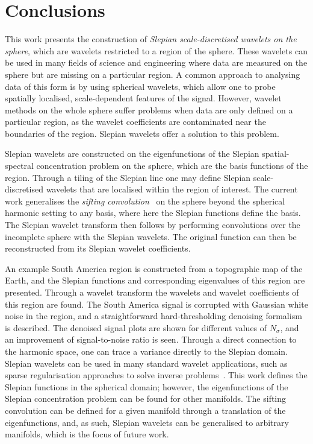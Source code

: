 

\section{Conclusions}\label{sec:chapter3_conclusion}

This work presents the construction of \emph{Slepian scale-discretised wavelets on the sphere}, which are wavelets restricted to a region of the sphere.
These wavelets can be used in many fields of science and engineering where data are measured on the sphere but are missing on a particular region.
A common approach to analysing data of this form is by using spherical wavelets, which allow one to probe spatially localised, scale-dependent features of the signal.
However, wavelet methods on the whole sphere suffer problems when data are only defined on a particular region, as the wavelet coefficients are contaminated near the boundaries of the region.
Slepian wavelets offer a solution to this problem.

Slepian wavelets are constructed on the eigenfunctions of the Slepian spatial-spectral concentration problem on the sphere, which are the basis functions of the region.
Through a tiling of the Slepian line one may define Slepian scale-discretised wavelets that are localised within the region of interest.
The current work generalises the \emph{sifting convolution}~\cite{Roddy2021} on the sphere beyond the spherical harmonic setting to any basis, where here the Slepian functions define the basis.
The Slepian wavelet transform then follows by performing convolutions over the incomplete sphere with the Slepian wavelets.
The original function can then be reconstructed from its Slepian wavelet coefficients.

An example South America region is constructed from a topographic map of the Earth, and the Slepian functions and corresponding eigenvalues of this region are presented.
Through a wavelet transform the wavelets and wavelet coefficients of this region are found.
The South America signal is corrupted with Gaussian white noise in the region, and a straightforward hard-thresholding denoising formalism is described.
The denoised signal plots are shown for different values of \(N_{\sigma}\), and an improvement of signal-to-noise ratio is seen.
Through a direct connection to the harmonic space, one can trace a variance directly to the Slepian domain.
Slepian wavelets can be used in many standard wavelet applications, such as sparse regularisation approaches to solve inverse problems~\cite{McEwen2013a,Wallis2017,Price2021}.
This work defines the Slepian functions in the spherical domain; however, the eigenfunctions of the Slepian concentration problem can be found for other manifolds.
The sifting convolution can be defined for a given manifold through a translation of the eigenfunctions, and, as such, Slepian wavelets can be generalised to arbitrary manifolds, which is the focus of future work.
